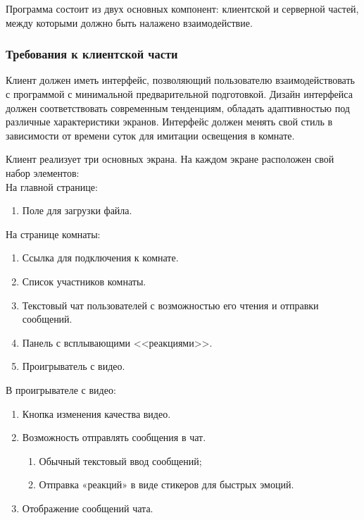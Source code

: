 Программа состоит из двух основных компонент: клиентской и серверной частей, между которыми должно быть налажено
взаимодействие.

\subsubsection{Требования к клиентской части}
Клиент должен иметь интерфейс, позволяющий пользователю взаимодействовать с программой с минимальной предварительной
подготовкой.
Дизайн интерфейса должен соответствовать современным тенденциям, обладать адаптивностью под различные характеристики
экранов.
Интерфейс должен менять свой стиль в зависимости от времени суток для имитации освещения в комнате.

Клиент реализует три основных экрана.
На каждом экране расположен свой набор элементов:\\

На главной странице:
\begin{enumerate}[noitemsep]
    \item Поле для загрузки файла.
\end{enumerate}

На странице комнаты:
\begin{enumerate}[noitemsep]
    \item Ссылка для подключения к комнате.
    \item Список участников комнаты.
    \item Текстовый чат пользователей с возможностью его чтения и отправки сообщений.
    \item Панель с всплывающими <<реакциями>>.
    \item Проигрыватель с видео.
\end{enumerate}

В проигрывателе с видео:
\begin{enumerate}[noitemsep]
    \item Кнопка изменения качества видео.
    \item Возможность отправлять сообщения в чат.
    \begin{enumerate}
        \item Обычный текстовый ввод сообщений;
        \item Отправка «реакций» в виде стикеров для быстрых эмоций.
    \end{enumerate}
    \item Отображение сообщений чата.
\end{enumerate}


